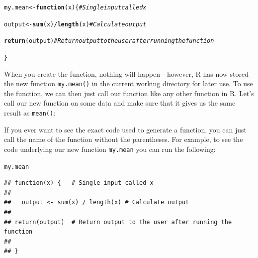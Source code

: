 \documentclass{tufte-book}\usepackage[]{graphicx}\usepackage[]{color}
\makeatletter
\newcommand{\hlcom}[1]{\textcolor[rgb]{0.678,0.584,0.686}{\textit{#1}}}%
\newcommand{\hlopt}[1]{\textcolor[rgb]{0,0,0}{#1}}%
\newcommand{\hlstd}[1]{\textcolor[rgb]{0.345,0.345,0.345}{#1}}%
\newcommand{\hlkwa}[1]{\textcolor[rgb]{0.161,0.373,0.58}{\textbf{#1}}}%
\newcommand{\hlkwb}[1]{\textcolor[rgb]{0.69,0.353,0.396}{#1}}%
\newcommand{\hlkwc}[1]{\textcolor[rgb]{0.333,0.667,0.333}{#1}}%
\newcommand{\hlkwd}[1]{\textcolor[rgb]{0.737,0.353,0.396}{\textbf{#1}}}%
\newenvironment{kframe}{%
 \def\at@end@of@kframe{}%
 \ifinner\ifhmode%
  \def\at@end@of@kframe{\end{minipage}}%
  \begin{minipage}{\columnwidth}%
 \fi\fi%
 \def\FrameCommand##1{\hskip\@totalleftmargin \hskip-\fboxsep
 \colorbox{shadecolor}{##1}\hskip-\fboxsep
     \hskip-\linewidth \hskip-\@totalleftmargin \hskip\columnwidth}%
 \MakeFramed {\advance\hsize-\width
   \@totalleftmargin\z@ \linewidth\hsize
   \@setminipage}}%
 {\par\unskip\endMakeFramed%
 \at@end@of@kframe}
\newenvironment{knitrout}{}{} %
\makeatother
\begin{document}
\begin{footnotesize}
\begin{knitrout}
\color{fgcolor}\begin{kframe}
\begin{alltt}
\hlstd{my.mean} \hlkwb{<-} \hlkwa{function}\hlstd{(}\hlkwc{x}\hlstd{) \{}   \hlcom{# Single input called x}

  \hlstd{output} \hlkwb{<-} \hlkwd{sum}\hlstd{(x)} \hlopt{/} \hlkwd{length}\hlstd{(x)} \hlcom{# Calculate output}

\hlkwd{return}\hlstd{(output)}  \hlcom{# Return output to the user after running the function}

\hlstd{\}}
\end{alltt}
\end{kframe}
\end{knitrout}

When you create the function, nothing will happen - however, R has now stored the new function \texttt{my.mean()} in the current working directory for later use. To use the function, we can then just call our function like any other function in R. Let's call our new function on some data and make sure that it gives us the same result as \texttt{mean()}:

\begin{marginfigure}

If you ever want to see the exact code used to generate a function, you can just call the name of the function without the parentheses. For example, to see the code underlying our new function \texttt{my.mean} you can run the following:

\begin{tiny}
\begin{knitrout}
\color{fgcolor}\begin{kframe}
\begin{alltt}
\hlstd{my.mean}
\end{alltt}
\begin{verbatim}
## function(x) {   # Single input called x
## 
##   output <- sum(x) / length(x) # Calculate output
##   
## return(output)  # Return output to the user after running the function
##   
## }
\end{verbatim}
\end{kframe}
\end{knitrout}
\end{tiny}

\end{marginfigure}




\end{footnotesize}
\end{document}
